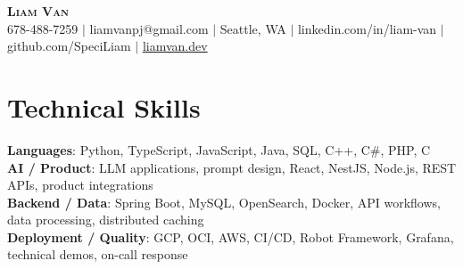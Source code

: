 \documentclass[letterpaper,11pt]{article}
\begin{document}

%
\begin{center}
    \textbf{\Huge \scshape Liam Van} \\ \vspace{1pt}
    \small 678-488-7259 $|$ \small {liamvanpj@gmail.com} $|$ Seattle, WA
 {{$|$ linkedin.com/in/liam-van} {$|$ github.com/SpeciLiam} {$|$ \href{https://liamvan.dev}{liamvan.dev}}}

\end{center}

\section{Technical Skills}
 \begin{itemize}[leftmargin=0.15in, label={}]
    \small{\item{
     \textbf{Languages}{: Python, TypeScript, JavaScript, Java, SQL, C++, C\#, PHP, C} \\
     \textbf{AI / Product}{: LLM applications, prompt design, React, NestJS, Node.js, REST APIs, product integrations} \\
     \textbf{Backend / Data}{: Spring Boot, MySQL, OpenSearch, Docker, API workflows, data processing, distributed caching} \\
     \textbf{Deployment / Quality}{: GCP, OCI, AWS, CI/CD, Robot Framework, Grafana, technical demos, on-call response} \\
    }}
 \end{itemize}
%

\end{document}
